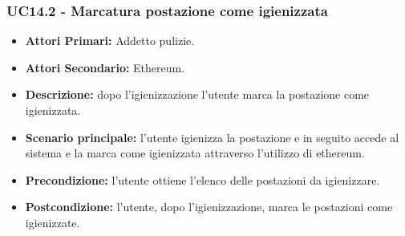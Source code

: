 \subsubsection{UC14.2 - Marcatura postazione come igienizzata}
\begin{itemize}
           	\item\textbf{Attori Primari:} Addetto pulizie.
		\item\textbf{Attori Secondario:} Ethereum.
           	\item\textbf{Descrizione:} dopo l'igienizzazione l'utente marca la postazione come igienizzata.
           	\item\textbf{Scenario principale:} l'utente igienizza la postazione e in seguito accede al sistema e la marca come igienizzata attraverso l'utilizzo di ethereum.
           	\item\textbf{Precondizione:} l'utente ottiene l'elenco delle postazioni da igienizzare.
           	\item\textbf{Postcondizione:} l'utente, dopo l'igienizzazione, marca le postazioni come igienizzate.
\end{itemize}
